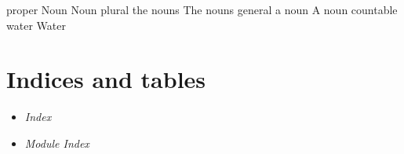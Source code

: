 \documentclass[letterpaper,10pt,english]{manual}
\begin{document}
proper    Noun      Noun
plural    the nouns The nouns
general   a noun    A noun
countable water     Water


\chapter{Indices and tables}
\begin{itemize}
\item {} 
\emph{Index}

\item {} 
\emph{Module Index}

\end{itemize}


\renewcommand{\indexname}{Module Index}
\printmodindex
\renewcommand{\indexname}{Index}
\printindex
\end{document}
